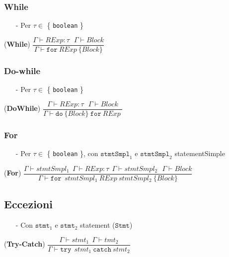 \documentclass[12pt]{article}
\begin{document}
\subsubsection*{While}
\begin{center}
\begin{itemize}
\item[-] Per $\tau \in$ \{ \texttt{boolean} \}
\end{itemize}
\noindent(\textbf{While})
$\dfrac{\Gamma \vdash RExp:\tau\ \ \ \Gamma \vdash Block}{\Gamma \vdash \texttt{for}\ RExp\ \{ Block\}}$\\[0.1in]
\end{center}

\subsubsection*{Do-while}
\begin{center}
\begin{itemize}
\item[-] Per $\tau \in$ \{ \texttt{boolean} \}
\end{itemize}
\noindent(\textbf{DoWhile})
$\dfrac{\Gamma \vdash RExp:\tau\ \ \ \Gamma \vdash Block}{\Gamma \vdash \texttt{do} \ \{ Block\} \ \texttt{for} \ RExp\ }$\\[0.1in]
\end{center}

\subsubsection*{For}
\begin{center}
\begin{itemize}
\item[-] Per $\tau \in$ \{ \texttt{boolean} \}, con $\texttt{stmtSmpl}_1$ e $\texttt{stmtSmpl}_2$ statementSimple
\end{itemize}
\noindent(\textbf{For})
$\dfrac{\Gamma \vdash stmtSmpl_1 \ \ \Gamma \vdash RExp:\tau \ \ \Gamma \vdash stmtSmpl_2 \ \ \ \Gamma \vdash Block}{\Gamma \vdash  \texttt{for} \ \ stmtSmpl_1 \ RExp \ stmtSmpl_2 \ \{ Block\}}$\\[0.1in]
\end{center}

\subsection*{Eccezioni}
\begin{center}
\begin{itemize}
\item[-] Con $\texttt{stmt}_1$ e $\texttt{stmt}_2$ statement ($\texttt{Stmt}$)
\end{itemize}
\noindent(\textbf{Try-Catch})
$\dfrac{\Gamma \vdash stmt_1\ \ \Gamma \vdash tmt_2}{\Gamma \vdash  \texttt{try} \ \ stmt_1 \ \texttt{catch} \ stmt_2}$\\[0.1in]
\end{center}
\end{document}
